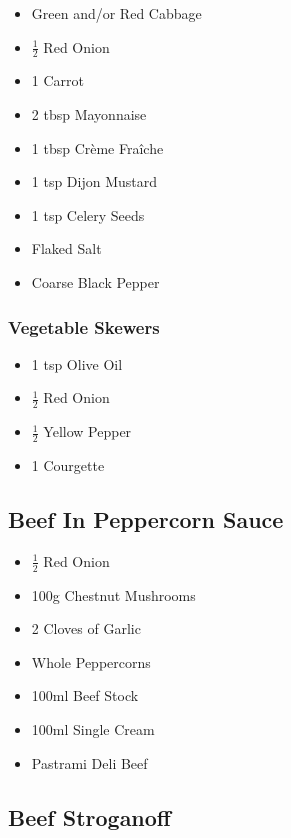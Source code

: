 \documentclass[11pt, english]{article}
\begin{document}
	\begin{itemize}
        \setlength\itemsep{0cm}
                \item Green and/or Red Cabbage
		\item $\frac{1}{2}$ Red Onion
		\item 1 Carrot
		\item 2 tbsp Mayonnaise
		\item 1 tbsp Cr\`{e}me Fra\^{i}che
		\item 1 tsp Dijon Mustard
		\item 1 tsp Celery Seeds
		\item Flaked Salt
		\item Coarse Black Pepper
        \end{itemize}

		\subsubsection*{Vegetable Skewers}

	\begin{itemize}
        \setlength\itemsep{0cm}
		\item 1 tsp Olive Oil
		\item $\frac{1}{2}$ Red Onion
		\item $\frac{1}{2}$ Yellow Pepper
		\item 1 Courgette
        \end{itemize}

\newpage

	\subsection{Beef In Peppercorn Sauce}

	\begin{itemize}
        \setlength\itemsep{0cm}
		\item $\frac{1}{2}$ Red Onion
		\item 100g Chestnut Mushrooms
		\item 2 Cloves of Garlic
		\item Whole Peppercorns
		\item 100ml Beef Stock
		\item 100ml Single Cream
		\item Pastrami Deli Beef
        \end{itemize}

\newpage

	\subsection{Beef Stroganoff}
\end{document}
